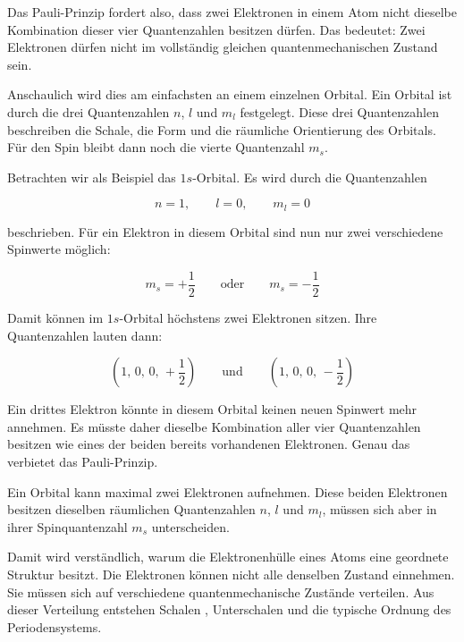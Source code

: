 Das Pauli-Prinzip fordert also, dass zwei Elektronen in einem Atom nicht
dieselbe Kombination dieser vier Quantenzahlen besitzen dürfen. Das bedeutet:
Zwei Elektronen dürfen nicht im vollständig gleichen quantenmechanischen
Zustand sein.

Anschaulich wird dies am einfachsten an einem einzelnen Orbital. Ein Orbital
 ist durch die drei Quantenzahlen \(n\), \(l\) und \(m_l\)
festgelegt. Diese drei Quantenzahlen beschreiben die Schale, die Form und die
räumliche Orientierung des Orbitals. Für den Spin bleibt dann noch die vierte
Quantenzahl \(m_s\).

Betrachten wir als Beispiel das \(1s\)-Orbital. Es wird durch
die Quantenzahlen

\begin{equation}
	n = 1, \qquad l = 0, \qquad m_l = 0
	\label{eq:quantenzahlen_1s_orbital}
\end{equation}

beschrieben. Für ein Elektron in diesem Orbital sind nun nur zwei verschiedene
Spinwerte möglich:

\begin{equation}
	m_s = +\frac{1}{2}
	\qquad \text{oder} \qquad
	m_s = -\frac{1}{2}
	\label{eq:spinwerte_1s_orbital}
\end{equation}

Damit können im \(1s\)-Orbital höchstens zwei Elektronen sitzen. Ihre
Quantenzahlen lauten dann:

\begin{equation}
	\left(1,\,0,\,0,\,+\frac{1}{2}\right)
	\qquad \text{und} \qquad
	\left(1,\,0,\,0,\,-\frac{1}{2}\right)
	\label{eq:zwei_elektronen_1s}
\end{equation}

Ein drittes Elektron könnte in diesem Orbital keinen neuen Spinwert mehr
annehmen. Es müsste daher dieselbe Kombination aller vier Quantenzahlen besitzen
wie eines der beiden bereits vorhandenen Elektronen. Genau das verbietet das
Pauli-Prinzip.

\begin{PhysicsBox}
	\label{box:pauli_prinzip_orbital}
	Ein Orbital kann maximal zwei Elektronen aufnehmen. Diese beiden Elektronen
	besitzen dieselben räumlichen Quantenzahlen \(n\), \(l\) und \(m_l\), müssen
	sich aber in ihrer Spinquantenzahl \(m_s\) unterscheiden.
\end{PhysicsBox}

Damit wird verständlich, warum die Elektronenhülle eines
Atoms eine geordnete Struktur besitzt. Die Elektronen können nicht alle
denselben Zustand einnehmen. Sie müssen sich auf verschiedene
quantenmechanische Zustände verteilen. Aus dieser Verteilung entstehen Schalen
, Unterschalen und die typische Ordnung
des Periodensystems.

